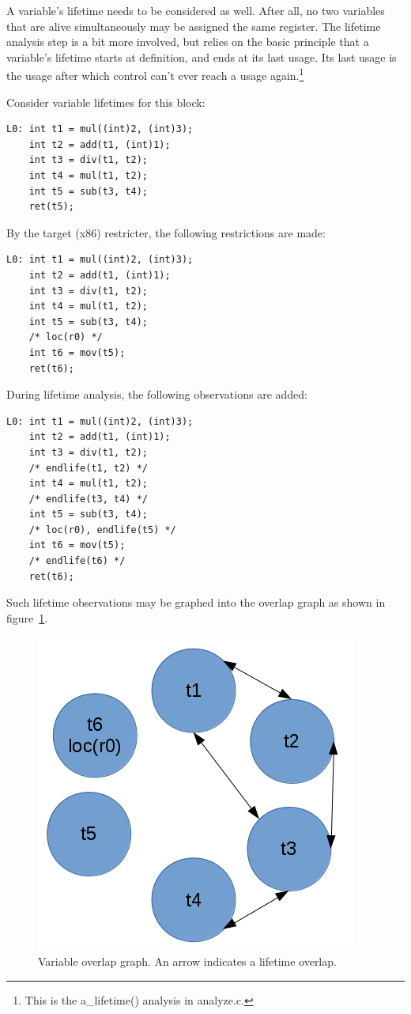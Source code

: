 \documentclass[12pt, a4paper]{article}
\begin{document}
A variable's lifetime needs to be considered as well. After all, no two
variables that are alive simultaneously may be assigned the same register. The
lifetime analysis step is a bit more involved, but relies on the basic principle
that a variable's lifetime starts at definition, and ends at its last usage. Its
last usage is the usage after which control can't ever reach a usage
again.\footnote{This is the a\_lifetime() analysis in analyze.c.}

Consider variable lifetimes for this block:

\begin{lstlisting}
L0:	int t1 = mul((int)2, (int)3);
	int t2 = add(t1, (int)1);
	int t3 = div(t1, t2);
	int t4 = mul(t1, t2);
	int t5 = sub(t3, t4);
	ret(t5);
\end{lstlisting}

By the target (x86) restricter, the following restrictions are made:

\begin{lstlisting}
L0:	int t1 = mul((int)2, (int)3);
	int t2 = add(t1, (int)1);
	int t3 = div(t1, t2);
	int t4 = mul(t1, t2);
	int t5 = sub(t3, t4);
	/* loc(r0) */
	int t6 = mov(t5);
	ret(t6);
\end{lstlisting}

During lifetime analysis, the following observations are added:

\begin{lstlisting}
L0:	int t1 = mul((int)2, (int)3);
	int t2 = add(t1, (int)1);
	int t3 = div(t1, t2);
	/* endlife(t1, t2) */
	int t4 = mul(t1, t2);
	/* endlife(t3, t4) */
	int t5 = sub(t3, t4);
	/* loc(r0), endlife(t5) */
	int t6 = mov(t5);
	/* endlife(t6) */
	ret(t6);
\end{lstlisting}

Such lifetime observations may be graphed into the overlap graph as shown in
figure~\ref{fig:ovl}.

\begin{figure}[h]
\begin{center}
\includegraphics[resolution=128]{ovldump.png}
\caption{Variable overlap graph. An arrow indicates a lifetime overlap.}
\label{fig:ovl}
\end{center}
\end{figure}
\end{document}
